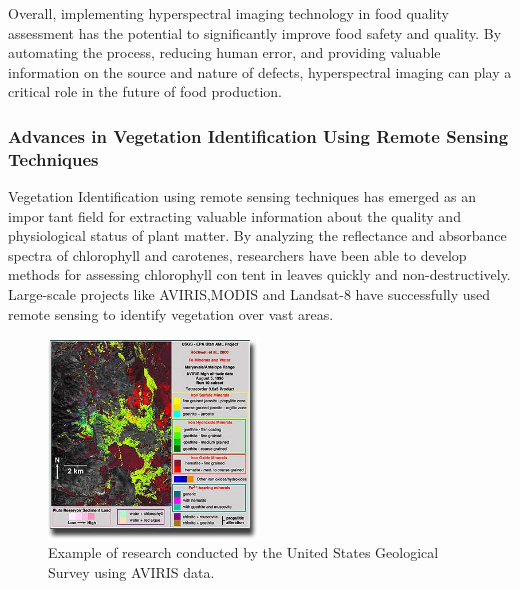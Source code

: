 \documentclass{article}
\begin{document}
{                Overall, implementing hyperspectral imaging technology in food quality assessment has the potential to significantly improve food safety and quality. By automating the process, reducing human error, and providing valuable information on the source and nature of defects, hyperspectral imaging can play a critical role in the future of food production.\cite{Kumar}
                \newpage
                
                \subsubsection{Advances in Vegetation Identification Using Remote Sensing Techniques}
                \hspace{0.5cm}Vegetation Identification using remote sensing techniques has emerged as an important field for extracting valuable information about the quality and physiological status of plant matter. By analyzing the reflectance and absorbance spectra of chlorophyll and carotenes, researchers have been able to develop methods for assessing chlorophyll content in leaves quickly and non-destructively. Large-scale projects like AVIRIS,MODIS and Landsat-8 have successfully used remote sensing to identify vegetation over vast areas.\par

                \begin{figure}[htp]
                    \centering
                    \includegraphics[width=0.5\textwidth]{Figures/AVIRIS.png}
                    \caption{Example of research conducted by the United States Geological Survey using AVIRIS data.}
                    \label{fig:aoua}
                \end{figure}
            
}
\end{document}
